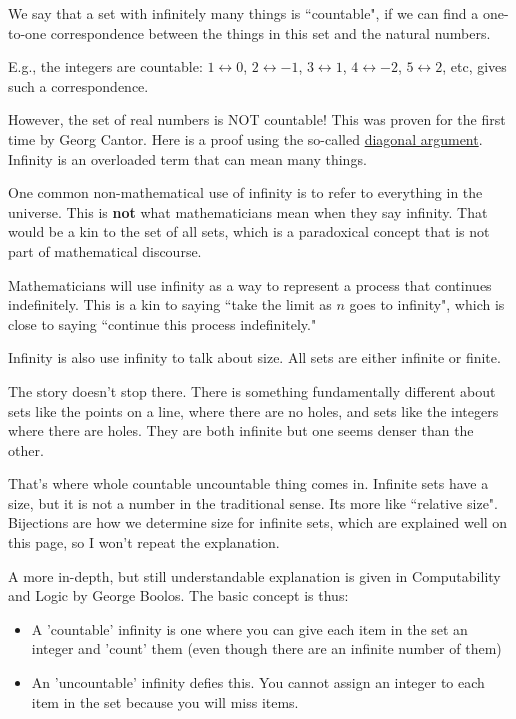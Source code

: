 We say that a set with infinitely many things is ``countable", 
if we can find a one-to-one correspondence between the things in this set and the natural numbers.

E.g., the integers are countable: $1 \leftrightarrow 0$, $2 \leftrightarrow -1$, $3 \leftrightarrow 1$, 
$4 \leftrightarrow -2$, $5 \leftrightarrow 2$, etc, gives such a correspondence.

However, the set of real numbers is NOT countable! 
This was proven for the first time by Georg Cantor. 
Here is a proof using the so-called \href{http://en.wikipedia.org/wiki/Cantor's\_diagonal\_argument}{diagonal argument}.
\es
\bs
Infinity is an overloaded term that can mean many things.

One common non-mathematical use of infinity is to refer to 
everything in the universe. This is {\bf not} what mathematicians mean 
when they say infinity. That would be a kin to the set of all sets, 
which is a paradoxical concept that is not part of mathematical discourse.

Mathematicians will use infinity as a way to represent a process that 
continues indefinitely. This is a kin to saying ``take the limit as $n$ goes 
to infinity", which is close to saying ``continue this process indefinitely."

Infinity is also use infinity to talk about size. All sets are either infinite or finite.

The story doesn't stop there. There is something fundamentally different about 
sets like the points on a line, where there are no holes, and sets like the 
integers where there are holes. They are both infinite but one seems denser 
than the other. 

That's where whole countable uncountable thing comes in. Infinite sets 
have a size, but it is not a number in the traditional sense. Its more 
like ``relative size". Bijections are how we determine size for infinite sets, 
which are explained well on this page, so I won't repeat the explanation. 

A more in-depth, but still understandable explanation is given in 
Computability and Logic by George Boolos.
\es
\bs
The basic concept is thus:
\begin{itemize}
 \item A 'countable' infinity is one where you can give each item 
 in the set an integer and 'count' them (even though there are 
 an infinite number of them)
 \item An 'uncountable' infinity defies this. You cannot assign 
 an integer to each item in the set because you will miss items.
\end{itemize}

